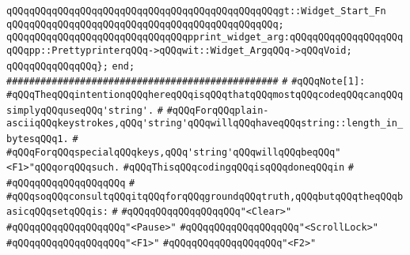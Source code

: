 \verb|qQQqqQQqqQQqqQQqqQQqqQQqqQQqqQQqqQQqqQQqqQQqqQQqgt::Widget_Start_Fn|\newline
\verb|qQQqqQQqqQQqqQQqqQQqqQQqqQQqqQQqqQQqqQQqqQQqqQQq;|\newline
\newline
\verb|qQQqqQQqqQQqqQQqqQQqqQQqqQQqqQQqpprint_widget_arg:qQQqqQQqqQQqqQQqqQQqqQQqpp::PrettyprinterqQQq->qQQqwit::Widget_ArgqQQq->qQQqVoid;|\newline
\verb|qQQqqQQqqQQqqQQq};|\newline
\newline
\newline
\verb|end;|\newline
\newline
\newline
\newline
\verb|################################################|\newline
\verb|#|\newline
\verb|#qQQqNote[1]:|\newline
\verb|#qQQqTheqQQqintentionqQQqhereqQQqisqQQqthatqQQqmostqQQqcodeqQQqcanqQQqsimplyqQQquseqQQq'string'.|\newline
\verb|#|\newline
\verb|#qQQqForqQQqplain-asciiqQQqkeystrokes,qQQq'string'qQQqwillqQQqhaveqQQqstring::length_in_bytesqQQq1.|\newline
\verb|#|\newline
\verb|#qQQqForqQQqspecialqQQqkeys,qQQq'string'qQQqwillqQQqbeqQQq"<F1>"qQQqorqQQqsuch.|\newline
\verb|#qQQqThisqQQqcodingqQQqisqQQqdoneqQQqin|\newline
\verb|#|\newline
\verb|#qQQqqQQqqQQqqQQqqQQq|\newline
\verb|#|\newline
\verb|#qQQqsoqQQqconsultqQQqitqQQqforqQQqgroundqQQqtruth,qQQqbutqQQqtheqQQqbasicqQQqsetqQQqis:|\newline
\verb|#|\newline
\verb|#qQQqqQQqqQQqqQQqqQQq"<Clear>"|\newline
\verb|#qQQqqQQqqQQqqQQqqQQq"<Pause>"|\newline
\verb|#qQQqqQQqqQQqqQQqqQQq"<ScrollLock>"|\newline
\verb|#qQQqqQQqqQQqqQQqqQQq"<F1>"|\newline
\verb|#qQQqqQQqqQQqqQQqqQQq"<F2>"|\newline
